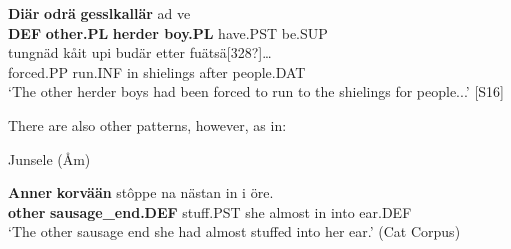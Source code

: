 
 \ea\label{}
\gll \textbf{Diär} \textbf{odrä} \textbf{gesslkallär} ad  ve\\


\textbf{DEF} \textbf{other.PL} \textbf{herder boy.PL} have.PST  be.SUP\\

 \ea\label{}
\gll tungnäd  kåit  upi  budär  etter  fuätsä[328?]…\\


forced.PP  run.INF  in  shielings  after  people.DAT\\

\glt ‘The other herder boys had been forced to run to the shielings for people...’ [S16]

\z

There are also other patterns, however, as in:


\item 

Junsele (Åm)



 \ea\label{}
\gll \textbf{Anner}\textbf{  korvään} stôppe  na  nästan  in  i  öre.\\


\textbf{other} \textbf{sausage\_end.DEF} stuff.PST  she  almost  in  into  ear.DEF\\

\glt ‘The other sausage end she had almost stuffed into her ear.’ (Cat Corpus)

\z

